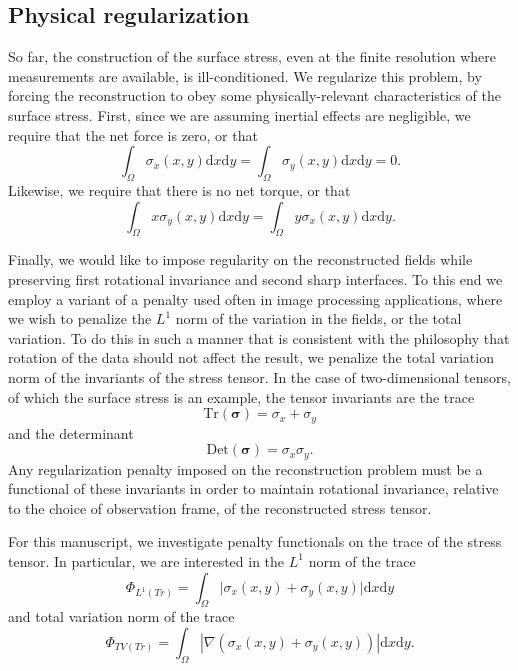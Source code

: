 \documentclass[aps,prl,reprint,twocolumn,groupedaddress,showpacs]{revtex4-1}
\newcommand{\bsigma}{{\boldsymbol\sigma}}
\def\dd{\mbox{d}}
\begin{document}
\subsection{Physical regularization}

So far, the construction of the surface stress, even at the finite
resolution where measurements are available, is ill-conditioned. We 
regularize this problem, by forcing the reconstruction to obey some physically-relevant
characteristics of the surface stress. First, since we are assuming inertial
effects are negligible, we require that the net force is zero, or that
\begin{equation}
\int_\Omega\sigma_{x}(x,y)\dd x \dd y= \int_\Omega\sigma_{y}(x,y)\dd x \dd y = 0 .
\end{equation}
Likewise, we require that there is no net torque, or that
\begin{equation}
\int_\Omega x \sigma_{y}(x,y)\dd x \dd y  = \int_\Omega y \sigma_{x}(x,y)\dd x \dd y .
\end{equation}
 
 Finally, we would like to impose regularity on the reconstructed fields while preserving first
 rotational invariance and second sharp interfaces. To this end we employ a variant of a penalty
 used often in image processing applications, where we wish to penalize the $L^1$ norm of the
 variation in the fields, or the total variation. To do this in such a manner that is consistent with
the philosophy that rotation of the data should not affect the result, we penalize the total variation
norm of the invariants of the stress tensor. In the case of two-dimensional tensors, of which the surface stress
is an example, the tensor invariants are the trace
\begin{equation}
\textrm{Tr}(\bsigma) = \sigma_{x} + \sigma_{y}
\end{equation}
and the determinant
\begin{equation}
\textrm{Det}(\bsigma) = \sigma_{x} \sigma_{y}.
\end{equation}
Any regularization penalty imposed on the reconstruction problem must be a functional
of these invariants in order to maintain rotational invariance, relative to the choice of observation frame,
 of the reconstructed stress tensor.
 
For this manuscript, we  investigate penalty functionals on the trace of the stress tensor. In particular, we are interested in the $L^1$ norm of the trace
\begin{equation}
\Phi_{L^1(Tr)} = \int_\Omega \vert \sigma_{x}(x,y) + \sigma_{y}(x,y)  \vert \dd x\dd y
\label{eq:PhiL1Tr}
\end{equation}
and total variation norm of the trace
%
\begin{equation}
\Phi_{TV(Tr)} =  \int_\Omega | \nabla(\sigma_{x}(x,y) + \sigma_{y}(x,y) ) | \dd x\dd y.
\label{eq:PhiTVTr}
\end{equation}
\end{document}
